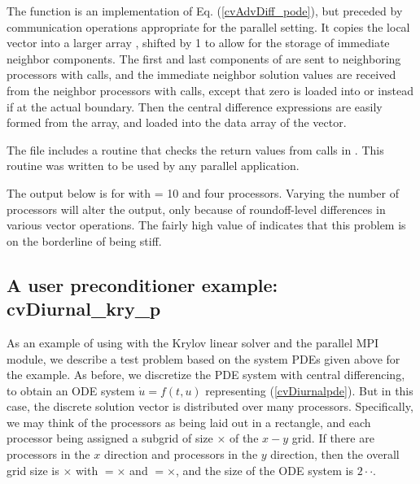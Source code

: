 The  function is an implementation of Eq. (\ref{cvAdvDiff_pode}), but preceded
by communication operations appropriate for the parallel setting.
It copies the local vector  into a larger array , shifted by 1
to allow for the storage of immediate neighbor components.  The first and last
components of  are sent to neighboring processors with  calls,
and the immediate neighbor solution values are received from the neighbor
processors with  calls, except that zero is loaded into 
or  instead if at the actual boundary.  Then the central
difference expressions are easily formed from the  array, and loaded into
the data array of the  vector.

The  file includes a routine  that checks the
return values from calls in .  This routine was written to be used
by any parallel {\sundials} application.

The output below is for  with  = 10 and four processors. 
Varying the number of processors will alter the output, only because
of roundoff-level differences in various vector operations.  The fairly
high value of  indicates that this problem is on the borderline
of being stiff.



\subsection{A user preconditioner example: cvDiurnal\_kry\_p}\label{ss:cvDiurnal_p}

As an example of using {\cvode} with the Krylov linear solver
{\cvspgmr} and the parallel MPI {\nvecp} module, we describe a test
problem based on the system PDEs given above for the  example.  
As before, we discretize the PDE system with central differencing, to
obtain an ODE system $\dot{u} = f(t,u)$ representing (\ref{cvDiurnalpde}).  
But in this case, the discrete solution vector is distributed over
many processors.  Specifically, we may think of the processors as
being laid out in a rectangle, and each processor being assigned a
subgrid of size $\times$ of the $x-y$ grid. If
there are  processors in the $x$ direction and 
processors in the $y$ direction, then the overall grid size is
$\times$ with $=$$\times$ and
$=$$\times$, and the size of the ODE system is
$2\cdot$$\cdot$.  


